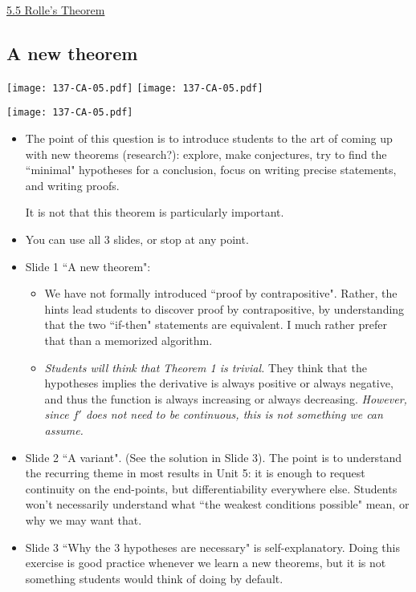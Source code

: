 \documentclass[11pt]{article}
\newcommand{\nl}{\hfill \vspace{-1.1\baselineskip}} %
\newcommand{\vv}{\hspace{8mm} \href{https://www.youtube.com/watch?v=n8Nhn7N_rkE&list=PLlwePzQY_wW9m5oabUf6hvfVfAaA9uAwM&index=5}{5.5 Rolle's Theorem}}
\begin{document}
\begin{videos}
\vv
\end{videos}

\newpage
\subsection{A new theorem}

\begin{center}
{ \texttt{[image: 137-CA-05.pdf]}}  \quad
{ \texttt{[image: 137-CA-05.pdf]}} 

{ \texttt{[image: 137-CA-05.pdf]}} 
\end{center}


\begin{comments}
\nl
\begin{itemize}
\item  The point of this question is to introduce students to the art of coming up with new theorems (research?): explore, make conjectures, try to find the ``minimal" hypotheses for a conclusion, focus on writing precise statements, and writing proofs.

  It is not that this theorem is particularly important.  
\item You can use all 3 slides, or stop at any point.
\item Slide 1 ``A new theorem":
	\begin{itemize}
		\item  We have not formally introduced ``proof by contrapositive".   Rather, the hints lead students to discover proof by contrapositive, by understanding that the two ``if-then" statements are equivalent.  I much rather prefer that than a memorized algorithm.
		\item \textit{Students will think that Theorem 1 is trivial.}  They think that the hypotheses implies the derivative is always positive or always negative, and thus the function is always increasing or always decreasing.  \textit{However, since $f'$ does not need to be continuous, this is not something we can assume.}
	\end{itemize}
\item Slide 2 ``A variant".  (See the solution in Slide 3).  The point is to understand the recurring theme in most results in Unit 5: it is enough to request continuity on the end-points, but differentiability everywhere else.   Students won't necessarily understand what ``the weakest conditions possible" mean, or why we may want that.
\item Slide 3 ``Why the 3 hypotheses are necessary" is self-explanatory.   Doing this exercise is good practice whenever we learn a new theorems, but it is not something students would think of doing by default.
\end{itemize}	
\end{comments}
\end{document}
